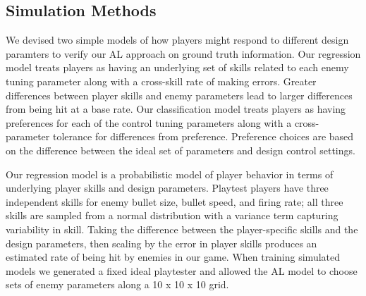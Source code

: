 \documentclass{sig-alternate}
\begin{document}
%
% 

%

\subsection{Simulation Methods}
We devised two simple models of how players might respond to different design paramters to verify our AL approach on ground truth information.
Our regression model treats players as having an underlying set of skills related to each enemy tuning parameter along with a cross-skill rate of making errors.
Greater differences between player skills and enemy parameters lead to larger differences from being hit at a base rate.
Our classification model treats players as having preferences for each of the control tuning parameters along with a cross-parameter tolerance for differences from preference.
Preference choices are based on the difference between the ideal set of parameters and design control settings.




Our regression model is a probabilistic model of player behavior in terms of underlying player skills and design parameters.
Playtest players have three independent skills for enemy bullet size, bullet speed, and firing rate; all three skills are sampled from a normal distribution with a variance term capturing variability in skill.
Taking the difference between the player-specific skills and the design parameters, then scaling by the error in player skills produces an estimated rate of being hit by enemies in our game.
When training simulated models we generated a fixed ideal playtester and allowed the AL model to choose sets of enemy parameters along a 10 x 10 x 10 grid.
\end{document}
